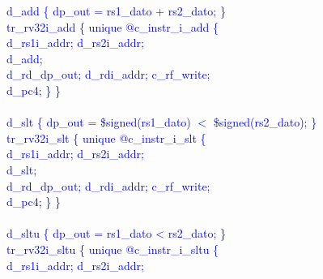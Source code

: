 \textcolor{blue}{
\indent d\_add \{ dp\_out = rs1\_dato + rs2\_dato; \}\\%
\indent tr\_rv32i\_add \{ unique @c\_instr\_i\_add \{ \\%
\indent \hspace{\parindent} d\_rs1i\_addr; d\_rs2i\_addr; \\%
\indent \hspace{\parindent} d\_add; \\%
\indent \hspace{\parindent} d\_rd\_dp\_out; d\_rdi\_addr; c\_rf\_write;  \\%
\indent \hspace{\parindent} d\_pc4; \} \} \\%
\\
\indent d\_slt \{ dp\_out = \$signed(rs1\_dato) $<$ \$signed(rs2\_dato); \}\\%
\indent tr\_rv32i\_slt \{ unique @c\_instr\_i\_slt \{ \\%
\indent \hspace{\parindent} d\_rs1i\_addr; d\_rs2i\_addr; \\%
\indent \hspace{\parindent} d\_slt; \\%
\indent \hspace{\parindent} d\_rd\_dp\_out; d\_rdi\_addr; c\_rf\_write;  \\%
\indent \hspace{\parindent} d\_pc4; \} \} \\%
\\
\indent d\_sltu \{ dp\_out = rs1\_dato < rs2\_dato; \}\\%
\indent tr\_rv32i\_sltu \{ unique @c\_instr\_i\_sltu \{ \\%
\indent \hspace{\parindent} d\_rs1i\_addr; d\_rs2i\_addr; \\%
}
